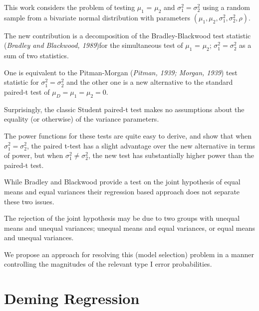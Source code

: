 \documentclass[12pt, a4paper]{report}
\theoremstyle{plain}
\theoremstyle{definition}
\theoremstyle{remark}
\begin{document}
	This work considers the problem of testing $\mu_1$ = $\mu_2$ and $\sigma^2_1 = \sigma^2_2$ using a random sample from a 
	bivariate normal distribution with parameters $(\mu_1, \mu_2, \sigma^2_1, \sigma^2_2, \rho)$. 
	
	The new contribution is a decomposition of the Bradley-Blackwood test statistic (\textit{Bradley and Blackwood, 1989})for 
	the simultaneous test of {$\mu_1$ = $\mu_2$; $\sigma^2_1 = \sigma^2_2$}  as a sum of two statistics. 
	
	One is equivalent to the Pitman-Morgan (\textit{Pitman, 1939; Morgan, 1939}) test statistic 
	for $\sigma^2_1 = \sigma^2_2$ and the other one is a new alternative to the standard paired-t test of $\mu_D = \mu_1 = \mu_2 = 0$. 
	
	Surprisingly, the classic Student paired-t test makes no assumptions about the equality (or otherwise) of the 
	variance parameters. 
	
	The power functions for these tests are quite easy to derive, and show that when $\sigma^2_1 = \sigma^2_2$, 
	the paired t-test has a slight advantage over the new alternative in terms of power, but when $\sigma^2_1 \neq \sigma^2_2$, the 
	new test has substantially higher power than the paired-t test.
	
	While Bradley and Blackwood provide a test on the joint hypothesis of equal means and equal variances their regression 
	based approach does not separate these two issues.
	
	The rejection of the joint hypothesis may be 
	due to two groups with unequal means and unequal variances; unequal means and equal variances, or equal means and unequal variances. 
	
	We propose an approach for resolving this (model selection) problem in a manner controlling the magnitudes of the 
	relevant type I error probabilities.
	
	
	
	\section*{Deming Regression}
	
\end{document}
